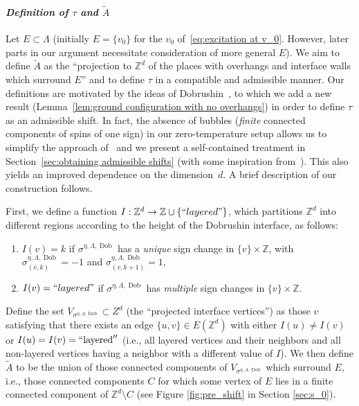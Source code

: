 \documentclass[11pt, reqno]{amsart}
\newcommand{\Z}{\mathbb{Z}}
\DeclareMathOperator{\Dob}{Dob}
\numberwithin{equation}{section}
\begin{document}
\smallskip
\paragraph{\emph{Definition of $\tau$ and $\tilde{A}$}}\label{sec:tau and tilde A def overview} 
Let $E\subset\Lambda$ (initially $E=\{v_0\}$ for the $v_0$ of~\eqref{eq:excitation at v_0}. However, later parts in our argument necessitate consideration of more general $E$). We aim to define $\tilde{A}$ as the ``projection to $\Z^d$ of the places with overhangs and interface walls which surround $E$'' and to define $\tau$ in a compatible and admissible manner. Our definitions are motivated by the ideas of Dobrushin~\cite{Dob}, to which we add a new result (Lemma~\ref{lem:ground configuration with no overhangs}) in order to define $\tau$ as an admissible shift. In fact, the absence of bubbles (\emph{finite} connected components of spins of one sign) in our zero-temperature setup allows us to simplify the approach of~\cite{Dob} and we present a self-contained treatment in Section~\ref{sec:obtaining admissible shifts} (with some inspiration from~\cites{PS23,PS20}). This also yields an improved dependence on the dimension~$d$. A brief description of our construction follows.

First, we define a function $I:\Z^d\to\Z\cup\{{\rm ``layered"}\}$, which partitions $\Z^d$ into different regions according to the height of the Dobrushin interface, as follows:
\begin{enumerate}
\item $I(v)=k$ if $\sigma^{\eta,\Lambda,\Dob}$ has a \emph{unique} sign change in $\{v\}\times\Z$, with $\sigma^{\eta,\Lambda,\Dob}_{(v,k)}=-1$ and $\sigma^{\eta,\Lambda,\Dob}_{(v,k+1)}=1$,
\item $I(v)={\rm ``layered"}$ if $\sigma^{\eta,\Lambda,\Dob}$ has \emph{multiple} sign changes in $\{v\}\times\Z$.
\end{enumerate} Define the set $V_{\sigma^{\eta,\Lambda,\Dob}} \subset Z^d$ (the ``projected interface vertices'') as those $v$ satisfying that there exists an edge $\{u,v\}\in E(\Z^d)$ with either $I(u) \neq I(v)$ or $I(u)=I(v)=``\text{layered}''$ (i.e., all layered vertices and their neighbors and all non-layered vertices having a neighbor with a different value of $I$). We then define $\tilde{A}$ to be the union of those connected components of $V_{\sigma^{\eta,\Lambda,\Dob}}$ which surround $E$, i.e., those connected components $C$ for which some vertex of $E$ lies in a finite connected component of $\Z^d\setminus C$ (see Figure \ref{fig:pre_shift} in Section \ref{sec:s_0}). 
\end{document}
